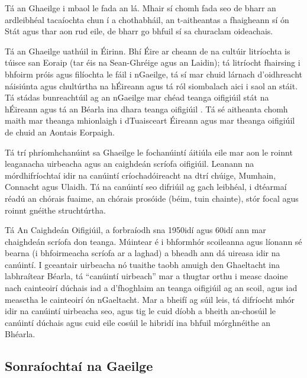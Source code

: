 \begin{multicols}{2}
Tá an Ghaeilge i mbaol le fada an lá. Mhair sí chomh fada seo de bharr an ardleibhéal tacaíochta chun í a chothabháil, an t-aitheantas a fhaigheann sí ón Stát agus thar aon rud eile, de bharr go bhfuil sí sa churaclam oideachais. 







Tá an Ghaeilge uathúil in Éirinn. Bhí Éire ar cheann de na cultúir litríochta is túisce san Eoraip (tar éis na Sean-Ghréige agus an Laidin); tá litríocht fhairsing i bhfoirm próis agus filíochta le fáil i nGaeilge, tá sí mar chuid lárnach d’oidhreacht náisiúnta agus chultúrtha na hÉireann agus tá ról siombalach aici i saol an stáit. Tá stádas bunreachtúil ag an nGaeilge mar chéad teanga oifigiúil stát na hÉireann agus tá an Béarla ina dhara teanga oifigiúil \cite{govtstatement06} \cite{20yearstrategy}. Tá sé aitheanta chomh maith mar theanga mhionlaigh i dTuaisceart Éireann agus mar theanga oifigiúil de chuid an Aontais Eorpaigh.

Tá trí phríomhchanúint sa Ghaeilge le fochanúintí áitiúla eile mar aon le roinnt leaganacha uirbeacha agus an caighdeán scríofa oifigiúil. Leanann na mórdhifríochtaí idir na canúintí críochadóireacht na dtrí chúige, Mumhain, Connacht agus Ulaidh. Tá na canúintí seo difriúil ag gach leibhéal, i dtéarmaí réadú an chórais fuaime, an chórais prosóide (béim, tuin chainte), stór focal agus roinnt gnéithe struchtúrtha. 

Tá An Caighdeán Oifigiúil, a forbraíodh sna 1950idí agus 60idí ann mar chaighdeán scríofa don teanga. Múintear é i bhformhór scoileanna agus líonann sé bearna (i bhfoirmeacha scríofa ar a laghad) a bheadh ann dá uireasa idir na canúintí. I gceantair uirbeacha nó tuaithe taobh amuigh den Ghaeltacht ina labhraítear Béarla, tá “canúintí uirbeach” mar a thugtar orthu i measc daoine nach cainteoirí dúchais iad a d’fhoghlaim an teanga oifigiúil ag an scoil, agus iad measctha le cainteoirí ón nGaeltacht. Mar a bheifí ag súil leis, tá difríocht mhór idir na canúintí uirbeacha seo, agus tig le cuid díobh a bheith an-chosúil le canúintí dúchais agus cuid eile cosúil le hibridí ina bhfuil mórghnéithe an Bhéarla. 



\subsection{Sonraíochtaí na Gaeilge}
\label{AboutIrish_ga}


\end{multicols}
